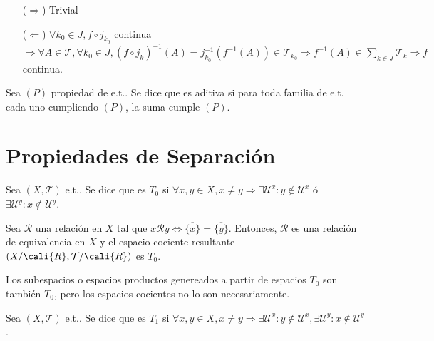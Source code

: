\begin{dem}
  \begin{enumerate}[label=(\roman*)]
    \item [($\Rightarrow$)] Trivial
    \item [($\Leftarrow$)] $\forall k_{0} \in J, f \circ j_{k_{0}}$ continua $\Rightarrow \forall A \in \mathcal{T}, \forall k_{0} \in J, (f \circ j_{k})^{-1}(A) = j_{k_{0}}^{-1}(f^{-1}(A)) \in \mathcal{T}_{k_{0}} \Rightarrow f^{-1}(A) \in \sum_{ k \in J } \mathcal{T}_{k} \Rightarrow f$ continua.
  \end{enumerate}
\end{dem}

\begin{defn}
  Sea $(P)$ propiedad de e.t.. Se dice que es aditiva si para toda familia de e.t. cada uno cumpliendo $(P)$, la suma cumple $(P)$.
\end{defn}

\chapter{Propiedades de Separación}

\begin{defn}[$T_0$]
  Sea $( X, \mathcal{T} )$ e.t.. Se dice que es $T_{0}$ si $\forall x, y \in X, x \neq y \Rightarrow \exists \mathcal{U}^{x} : y \not \in \mathcal{U}^{x} $ ó $ \exists \mathcal{U}^{y} : x \not \in \mathcal{U}^{y}$.
\end{defn}

\begin{ejm}
  Sea $\mathcal{R}$ una relación en $X$ tal que $x \mathcal{R} y \Leftrightarrow \overline{\{ x \}} = \overline{\{ y \}}$. Entonces, $\mathcal{R}$ es una relación de equivalencia en $X$ y el espacio cociente resultante $( X/\cali{R}, \mathcal{T}/\cali{R} )$ es $T_{0}$.
\end{ejm}

\begin{obs}
  Los subespacios o espacios productos genereados a partir de espacios $T_{0}$ son también $T_{0}$, pero los espacios cocientes no lo son necesariamente.
\end{obs}

\begin{defn}[$T_1$]
  Sea $( X, \mathcal{T} )$ e.t.. Se dice que es $T_{1}$ si $ \forall x, y \in X, x \neq y \Rightarrow \exists \mathcal{U}^{x}: y \not \in \mathcal{U}^{x}, \exists \mathcal{U}^{y}: x \not \in \mathcal{U}^{y}$.
\end{defn}

